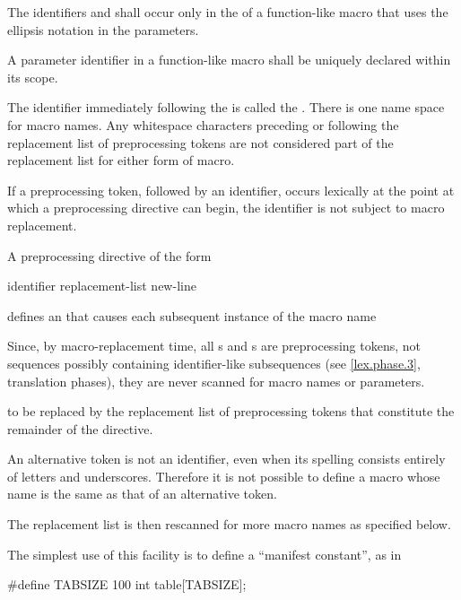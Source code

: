 \pnum
{}%
%
The identifiers  and 
shall occur only in the 
of a function-like macro that uses the ellipsis notation in the parameters.

\pnum
A parameter identifier in a function-like macro
shall be uniquely declared within its scope.

\pnum
The identifier immediately following the
is called the
%
.
There is one name space for macro names.
Any whitespace characters preceding or following the
replacement list of preprocessing tokens are not considered
part of the replacement list for either form of macro.

\pnum
If a
\tcode{\#}
preprocessing token,
followed by an identifier,
occurs lexically
at the point at which a preprocessing directive can begin,
the identifier is not subject to macro replacement.

\pnum
A preprocessing directive of the form
\begin{ncsimplebnf}
 identifier replacement-list new-line
%
\end{ncsimplebnf}
defines an
 that
causes each subsequent instance of the macro name
\begin{footnote}
Since, by macro-replacement time,
all s and s are preprocessing tokens,
not sequences possibly containing identifier-like subsequences
(see \ref{lex.phase.3}, translation phases),
they are never scanned for macro names or parameters.
\end{footnote}
to be replaced by the replacement list of preprocessing tokens
that constitute the remainder of the directive.
\begin{footnote}
An alternative token is not an identifier,
even when its spelling consists entirely of letters and underscores.
Therefore it is not possible to define a macro
whose name is the same as that of an alternative token.
\end{footnote}
The replacement list is then rescanned for more macro names as
specified below.

\pnum
\begin{example}
The simplest use of this facility is to define a ``manifest constant'',
as in
\begin{codeblock}
#define TABSIZE 100
int table[TABSIZE];
\end{codeblock}
\end{example}


